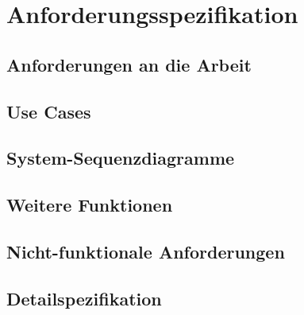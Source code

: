 \chapter{Anforderungsspezifikation}
\label{pd-anforderungsspezifikation}

\section{Anforderungen an die Arbeit}


\section{Use Cases}


\section{System-Sequenzdiagramme}


\section{Weitere Funktionen}


\section{Nicht-funktionale Anforderungen}


\section{Detailspezifikation}

